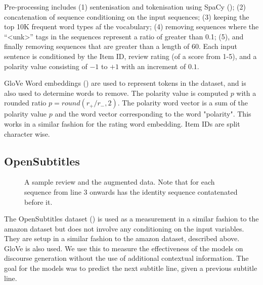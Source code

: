 \documentclass[12pt,twoside]{report}
\begin{document}

Pre-processing includes (1) sentenisation and tokenisation using SpaCy (\cite{honnibal_spacy_2017}); (2) concatenation of sequence conditioning on the input sequences; (3) keeping the top 10K frequent word types af the vocabulary; (4) removing sequences where the ``<unk>'' tags in the sequences represent a ratio of greater than 0.1; (5), and finally removing sequences that are greater than a length of 60. Each input sentence is conditioned by the Item ID, review rating (of a score from 1-5), and a polarity value consisting of $-1$ to $+1$ with an increment of $0.1$.


GloVe Word embeddings (\cite{pennington_glove:_2014}) are used to represent tokens in the dataset, and is also used to determine words to remove. The polarity value is computed  $p$ with a rounded ratio $p=round(r_{+}/r_{-},2)$. The polarity word vector is a sum of the polarity value $p$ and the word vector corresponding to the word "polarity". This works in a similar fashion for the rating word embedding. Item IDs are split character wise.

\subsection{OpenSubtitles}

\begin{figure}[!ht]
	\centering
	
	\caption{A sample review and the augmented data. Note that for each sequence from line 3 onwards has the identity sequence contatenated before it. \label{ex_dataset:subs}}
	\end{figure}

The OpenSubtitles dataset (\cite{lison_opensubtitles2016:_2016}) is used as a measurement in a similar fashion to the amazon dataset but does not involve any conditioning on the input variables. They are setup in a similar fashion to the amazon dataset, described above. GloVe is also used. We use this to measure the effectiveness of the models on discourse generation without the use of additional contextual information. The goal for the models was to predict the next subtitle line, given a previous subtitle line.
\end{document}
